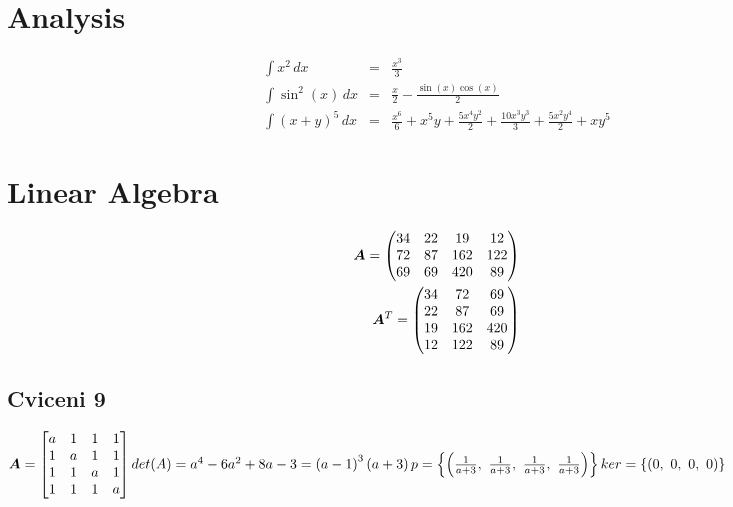 \documentclass[12pt]{article}
\begin{document}
    \section{Analysis}\label{sec:analysis}

    \begin{align}
        \int x^{2}\, dx &=& \frac{x^{3}}{3} \\
        \int \sin^{2}{\left(x \right)}\, dx &=& \frac{x}{2} - \frac{\sin{\left(x \right)} \cos{\left(x \right)}}{2} \\
        \int \left(x + y\right)^{5}\, dx &=& \frac{x^{6}}{6} + x^{5} y + \frac{5 x^{4} y^{2}}{2} + \frac{10 x^{3} y^{3}}{3} + \frac{5 x^{2} y^{4}}{2} + x y^{5}
    \end{align}


    \section{Linear Algebra}\label{sec:linalg}

    \begin{align}
        {\bm{A}} = \left(\begin{matrix}
                        34 & 22 & 19 & 12\\72 & 87 & 162 & 122\\69 & 69 & 420 & 89
        \end{matrix}\right) \\
        {\bm{A}}^{T} = \left(\begin{matrix}
                            34 & 72 & 69\\22 & 87 & 69\\19 & 162 & 420\\12 & 122 & 89
        \end{matrix}\right)
    \end{align}

    \subsection{Cviceni 9}\label{subsec:cv9}

    \begin{math}
        {\bm{A}}=\left[\begin{matrix}
                      a & 1 & 1 & 1\\1 & a & 1 & 1\\1 & 1 & a & 1\\1 & 1 & 1 & a
        \end{matrix}\right] \\
        det(A)=a^{4} - 6 a^{2} + 8 a - 3=\left(a - 1\right)^{3} \left(a + 3\right) \\
        p=\left\{\left( \frac{1}{a + 3}, \  \frac{1}{a + 3}, \  \frac{1}{a + 3}, \  \frac{1}{a + 3}\right)\right\} \\
        ker=\left\{\left( 0, \  0, \  0, \  0\right)\right\}
    \end{math}
\end{document}
